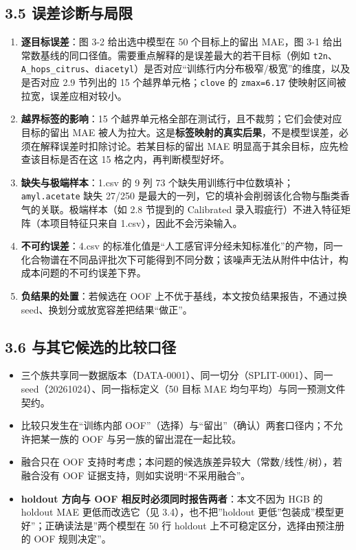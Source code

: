 \documentclass[
  11pt,
]{ctexart}
\providecommand{\tightlist}{%
  \setlength{\itemsep}{0pt}\setlength{\parskip}{0pt}}
\begin{document}
\subsection{3.5
误差诊断与局限}\label{ux8befux5deeux8bcaux65adux4e0eux5c40ux9650}

\begin{enumerate}
\def\labelenumi{\arabic{enumi}.}
\tightlist
\item
  \textbf{逐目标误差}：图 3-2 给出选中模型在 50 个目标上的留出 MAE，图
  3-1 给出常数基线的同口径值。需要重点解释的是误差最大的若干目标（例如
  \texttt{t2n}、\texttt{A\_\allowbreak{}hops\_\allowbreak{}citrus}、\texttt{diacetyl}）是否对应``训练行内分布极窄/极宽''的维度，以及是否对应
  2.9 节列出的 15 个越界单元格；\texttt{clove} 的 \texttt{zmax=6.17}
  使映射区间被拉宽，误差应相对较小。
\item
  \textbf{越界标签的影响}：15
  个越界单元格全部在测试行，且不裁剪；它们会使对应目标的留出 MAE
  被人为拉大。这是\textbf{标签映射的真实后果}，不是模型误差，必须在解释误差时扣除讨论。若某目标的留出
  MAE 明显高于其余目标，应先检查该目标是否在这 15
  格之内，再判断模型好坏。
\item
  \textbf{缺失与极端样本}：1.csv 的 9 列 73
  个缺失用训练行中位数填补；\texttt{amyl.acetate} 缺失 27/250
  是最大的一列，它的填补会削弱该化合物与酯类香气的关联。极端样本（如 2.8
  节提到的 Calibrated 录入瑕疵行）不进入特征矩阵（本项目特征只来自
  1.csv），因此不会污染输入。
\item
  \textbf{不可约误差}：4.csv
  的标准化值是``人工感官评分经未知标准化''的产物，同一化合物谱在不同品评批次下可能得到不同分数；该噪声无法从附件中估计，构成本问题的不可约误差下界。
\item
  \textbf{负结果的处置}：若候选在 OOF
  上不优于基线，本文按负结果报告，不通过换
  seed、换划分或放宽容差把结果``做正''。
\end{enumerate}

\subsection{3.6
与其它候选的比较口径}\label{ux4e0eux5176ux5b83ux5019ux9009ux7684ux6bd4ux8f83ux53e3ux5f84}

\begin{itemize}
\tightlist
\item
  三个族共享同一数据版本（DATA-0001）、同一切分（SPLIT-0001）、同一
  seed（20261024）、同一指标定义（50 目标 MAE
  均匀平均）与同一预测文件契约。
\item
  比较只发生在``训练内部
  OOF''（选择）与``留出''（确认）两套口径内；不允许把某一族的 OOF
  与另一族的留出混在一起比较。
\item
  融合只在 OOF
  支持时考虑；本问题的候选族差异较大（常数/线性/树），若融合没有 OOF
  证据支持，则如实说明``不采用融合''。
\item
  \textbf{holdout 方向与 OOF 相反时必须同时报告两者}：本文不因为 HGB 的
  holdout MAE 更低而改选它（见 3.4），也不把''holdout
  更低''包装成''模型更好''；正确读法是''两个模型在 50 行 holdout
  上不可稳定区分，选择由预注册的 OOF 规则决定''。
\end{itemize}
\end{document}
